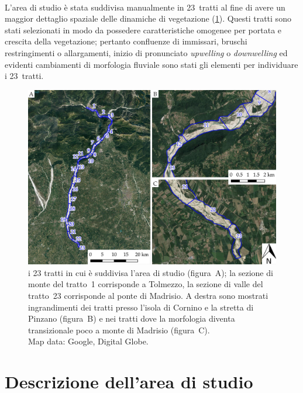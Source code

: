 %
\\
L'area di studio è stata suddivisa manualmente in 23~tratti al fine di avere un maggior dettaglio spaziale delle dinamiche di vegetazione (\cref{fig:23-tratti}). 
Questi tratti sono stati selezionati in modo da possedere caratteristiche omogenee per portata e crescita della vegetazione; 
pertanto confluenze di immissari, bruschi restringimenti o allargamenti, inizio di pronunciato \emph{upwelling} o \emph{downwelling} ed evidenti cambiamenti di morfologia fluviale sono stati gli elementi per individuare i 23~tratti.
%
\begin{figure}
	\centering
	\includegraphics[width=\textwidth]{files/tutti_23_tratti.jpeg}
	\caption[i 23 tratti in cui è suddivisa l'area di studio]{i 23 tratti in cui è suddivisa l'area di studio (figura~A); la sezione di monte del tratto~1 corrisponde a Tolmezzo, la sezione di valle del tratto~23 corrisponde al ponte di Madrisio. A destra sono mostrati ingrandimenti dei tratti presso l'isola di Cornino e la stretta di Pinzano (figura~B) e nei tratti dove la morfologia diventa transizionale poco a monte di Madrisio (figura~C).
	\\
	Map data: Google, Digital Globe.}
	\label{fig:23-tratti}
\end{figure}


\section{Descrizione dell'area di studio}
\label{sec:descr-area-studio}

